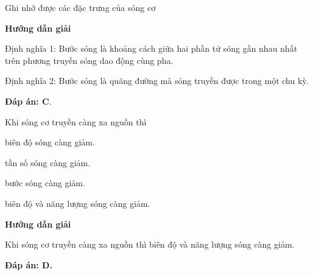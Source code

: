 \begin{dang}{Ghi nhớ được các đặc trưng của sóng cơ}
	{
		\begin{center}
			\textbf{Hướng dẫn giải}
		\end{center}
		
		Định nghĩa 1: Bước sóng là khoảng cách giữa hai phần tử sóng gần nhau nhất trên phương truyền sóng dao động cùng pha.
		
		Định nghĩa 2: Bước sóng là quãng đường mà sóng truyền được trong một chu kỳ.
		
		
		\textbf{Đáp án: C}.
	}
	
	{
		Khi sóng cơ truyền càng xa nguồn thì 
		\begin{mcq}
			\item biên độ sóng càng giảm.
			\item tần số sóng càng giảm.
			\item bước sóng càng giảm.
			\item biên độ và năng lượng sóng càng giảm.
		\end{mcq}
	}{
		\begin{center}
			\textbf{Hướng dẫn giải}
		\end{center}
		
		Khi sóng cơ truyền càng xa nguồn thì biên độ và năng lượng sóng càng giảm.
		
		\textbf{Đáp án: D.}
	}
	
\end{dang}
